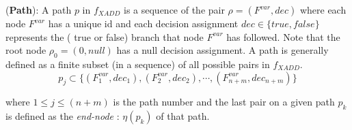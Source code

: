 \documentclass[twoside,11pt]{article}
\newenvironment{mydef}[1][Definition]{\begin{trivlist}
\item[\hskip \labelsep {\bfseries #1}]}{\end{trivlist}}
\begin{document}
\begin{mydef}(\textbf{Path}):
A path $p$ in $f_{XADD}$ is a sequence of the pair $\rho=(F^{var},\mathit{dec})$ where each node  $F^{var}$ has a unique id and each decision assignment $\mathit{dec} \in \lbrace \mathit{true},\mathit{false}\rbrace$ represents the ( true or false) branch that node $F^{var}$ has followed. Note that the root node $\rho_0=(0,null)$ has a null decision assignment. A path is generally defined as a finite subset (in a sequence) of all possible pairs in $f_{XADD}$.
\begin{equation*}
p_j \subset \lbrace (F_1^{var},\mathit{dec_1}), (F_2^{var},\mathit{dec_2}), \cdots, (F_{n+m}^{var},\mathit{dec_{n+m}}) \rbrace
\end{equation*}
\end{mydef}
where $1 \leq j \leq (n+m)$ is the path number and the last pair on a given path $p_k$ is defined as the \textit{end-node} : $\eta(p_k)$ of that path.
\end{document}
